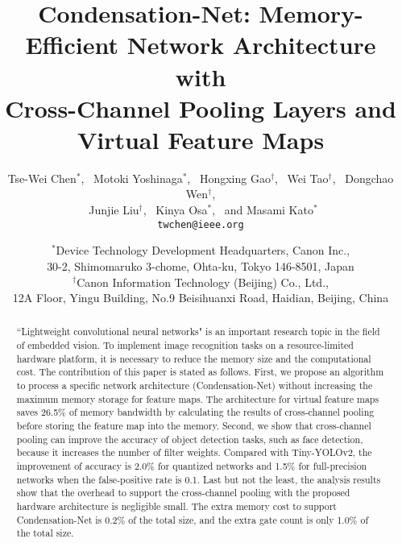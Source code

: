 \documentclass[10pt,twocolumn,letterpaper]{article}
\begin{document}
\title{Condensation-Net: Memory-Efficient Network Architecture with\\ Cross-Channel Pooling Layers and Virtual Feature Maps}
\author{Tse-Wei Chen$^*$,
~Motoki Yoshinaga$^*$,
~Hongxing Gao$^\dag$,
~Wei Tao$^\dag$,
~Dongchao Wen$^\dag$,\\
~Junjie Liu$^\dag$,
~Kinya Osa$^*$,
~and Masami Kato$^*$\\
{\tt\small twchen@ieee.org}\\
\and
$^*$Device Technology Development Headquarters, Canon Inc.,\\
30-2, Shimomaruko 3-chome, Ohta-ku, Tokyo 146-8501, Japan\\
$^\dag$Canon Information Technology (Beijing) Co., Ltd.,\\
12A Floor, Yingu Building, No.9 Beisihuanxi Road, Haidian, Beijing, China\\
}



\maketitle
\thispagestyle{empty}

\begin{abstract}
``Lightweight convolutional neural networks" is an important research topic in the field of embedded vision. To implement image recognition tasks on a resource-limited hardware platform, it is necessary to reduce the memory size and the computational cost. The contribution of this paper is stated as follows. First, we propose an algorithm to process a specific network architecture (Condensation-Net) without increasing the maximum memory storage for feature maps. The architecture for virtual feature maps saves 26.5\% of memory bandwidth by calculating the results of cross-channel pooling before storing the feature map into the memory. Second, we show that cross-channel pooling can improve the accuracy of object detection tasks, such as face detection, because it increases the number of filter weights. Compared with Tiny-YOLOv2, the improvement of accuracy is 2.0\% for quantized networks and 1.5\% for full-precision networks when the false-positive rate is 0.1. Last but not the least, the analysis results show that the overhead to support the cross-channel pooling with the proposed hardware architecture is negligible small. The extra memory cost to support Condensation-Net is 0.2\% of the total size, and the extra gate count is only 1.0\% of the total size.



\end{abstract}
\end{document}
